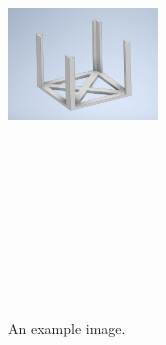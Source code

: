 \documentclass[a4paper, 12pt]{article}
\begin{document}
\begin{figure}[ht]
    \centering
    \includegraphics[width=150px,height=500px, keepaspectratio]{img/instalace_rozvadec_konstrukce_01.png}
    \caption{An example image.}
\end{figure}
\end{document}
